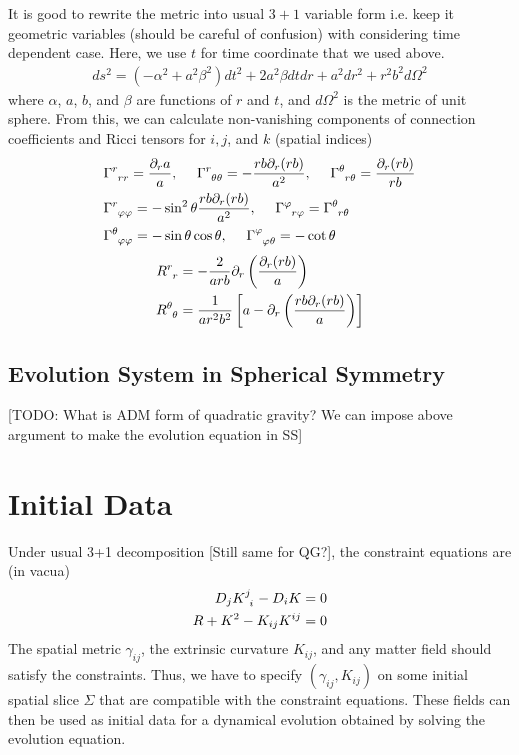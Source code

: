 \documentclass[a4paper,oneside,openany,11pt]{memoir}
\numberwithin{equation}{section} %
\newcommand{\TODO}[1]{{\color{red}[}{\color{red}TODO:} {\color{blue}#1}{\color{red}]}}
\newcommand{\NOTE}[1]{{\color{blue}[#1]}}
\begin{document}
It is good to rewrite the metric into usual $3+1$ variable form i.e. keep it geometric variables (should be careful of confusion) with considering time dependent case. Here, we use $t$ for time coordinate that we used above.
\begin{align}
\label{eqn:gen-sph-met}
ds^2 = (-\alpha^2 + a^2 \beta^2) dt^2 + 2a^2 \beta dt dr + a^2 dr^2 + r^2 b^2 d \Omega^2
\end{align}
where $\alpha$, $a$, $b$, and $\beta$ are functions of $r$ and $t$, and $d\Omega^2$ is the metric of unit sphere. From this, we can calculate non-vanishing components of connection coefficients and Ricci tensors for $i,j$, and $k$ (spatial indices)
\begin{align}
&\Gamma\indices{^r_{rr}} = \frac{\partial_r a}{a}, \,\,\,\,\,\,\,\, \Gamma\indices{^r_{\theta \theta}} = - \frac{rb \partial_r (rb)}{a^2}, \,\,\,\,\,\,\,\, \Gamma\indices{^\theta_{r \theta}} = \frac{\partial_r (rb)}{rb} \nonumber  \\
&\Gamma\indices{^r_{\varphi \varphi}} = -\sin^2 \theta \frac{rb \partial_r (rb)}{a^2}, \,\,\,\,\,\,\,\, \Gamma\indices{^\varphi_{r \varphi}} = \Gamma\indices{^\theta_{r \theta}} \nonumber \\
&\Gamma\indices{^\theta_{\varphi \varphi}} = -\sin \theta \cos \theta, \,\,\,\,\,\,\,\, \Gamma\indices{^\varphi_{\varphi \theta}} = -\cot \theta \nonumber 
\end{align}
\begin{align}
R\indices{^r_r} &= -\frac{2}{arb} \partial_r \left(\frac{\partial_r (rb)}{a} \right) \\
R\indices{^\theta_\theta} &= \frac{1}{ar^2b^2} \left[a-\partial_r \left(\frac{rb \partial_r (rb)}{a} \right) \right] \\
\end{align}


\subsection{Evolution System in Spherical Symmetry}
\TODO{What is ADM form of quadratic gravity? We can impose above argument to make the evolution equation in SS}

\section{Initial Data}
Under usual 3+1 decomposition \NOTE{Still same for QG?}, the constraint equations are (in vacua)
\begin{align}
D_j K\indices{^j_i} - D_i K &= 0 \\
R + K^2 - K_{ij} K^{ij} &= 0
\end{align}
The spatial metric $\gamma_{ij}$, the extrinsic curvature $K_{ij}$, and any matter field should 
satisfy the constraints. Thus, we have to specify $(\gamma_{ij}, K_{ij})$ on some initial 
spatial slice $\Sigma$ that are compatible with the constraint equations. These fields can 
then be used as initial data for a dynamical evolution obtained by solving the evolution equation.
\end{document}
